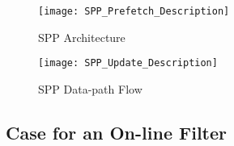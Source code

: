 \begin{figure}
  \begin{center}
  \texttt{[image: SPP\_Prefetch\_Description]}
    \label{fig:spp_strcture}
  \caption{SPP Architecture}
  \end{center}
\end{figure}

\begin{figure}
  \begin{center}
  \texttt{[image: SPP\_Update\_Description]}
  \label{fig:spp_update}
  \caption{SPP Data-path Flow}
  \end{center}
\end{figure}



\subsection{Case for an On-line Filter}
\label{Background-Case}

